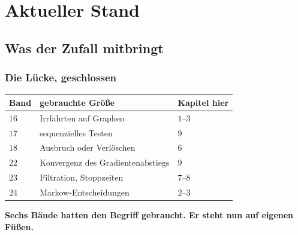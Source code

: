 \part{Aktueller Stand}

\chapter{Was der Zufall mitbringt}

\section{Die Lücke, geschlossen}

\begin{merksatz}
\begin{center}
{\small
\renewcommand{\arraystretch}{1.5}
\begin{tabular}{@{}P{1.8cm}P{3.0cm}P{3.4cm}@{}}
\toprule
\textbf{Band} & \textbf{gebrauchte Größe} & \textbf{Kapitel hier}\\
\midrule
$16$ & Irrfahrten auf Graphen & $1$--$3$\\
$17$ & sequenzielles Testen & $9$\\
$18$ & Ausbruch oder Verlöschen & $6$\\
$22$ & Konvergenz des Gradientenabstiegs & $9$\\
$23$ & Filtration, Stoppzeiten & $7$--$8$\\
$24$ & Markow-Entscheidungen & $2$--$3$\\
\bottomrule
\end{tabular}}
\end{center}

\begin{center}
\begin{minipage}{0.9\textwidth}
\textbf{Sechs Bände hatten den Begriff gebraucht. Er steht nun auf eigenen Füßen.}
\end{minipage}
\end{center}

\begin{center}
\begin{minipage}{0.88\textwidth}
\end{minipage}
\end{center}
\end{merksatz}

